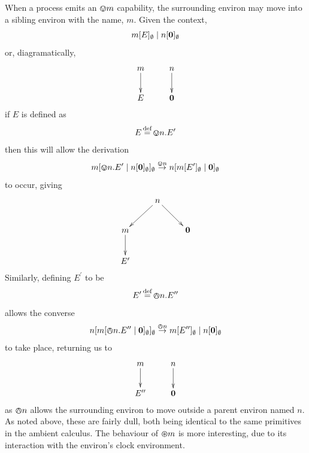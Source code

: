When a process emits an $\varovee m$ capability, the surrounding environ
may move into a sibling environ with the name, $m$.  Given the context,
\begin{equation}
{m}[ E ]_{\emptyset}\;|\;{n}[ \textbf{0} ]_{\emptyset}
\end{equation}
or, diagramatically,
\[\CompileMatrices
\xymatrix{
m \ar@{->}[d] &
n \ar@{->}[d] \\
E & \nil \\
}
\]
if $E$ is defined as
\begin{equation}
E \operatorname{\stackrel{\textrm{def}}{=}} \varovee n.E^\prime
\end{equation}
then this will allow the derivation
\begin{equation}
{m}[ \varovee n.E^\prime \;|\; {n}[ \textbf{0} ]_{\emptyset} ]_{\emptyset} \stackrel{\varovee n}{\rightarrow} 
{n}[ {m}[ E^\prime ]_{\emptyset} \;|\; \textbf{0} ]_{\emptyset}
\end{equation}
to occur, giving
\[\CompileMatrices
\xymatrix{
&
n \ar@{->}[ld] \ar@{->}[rd] & \\
m \ar@{->}[d] & & \nil \\
E' & &
}
\]
Similarly, defining $E^\prime$ to be
\begin{equation}
E^\prime \operatorname{\stackrel{\textrm{def}}{=}} \varowedge n.E^{\prime\prime}
\end{equation}
allows the converse
\begin{equation}
{n}[ {m}[ \varowedge n.E^{\prime\prime} \;|\; \textbf{0} ]_{\emptyset} ]_{\emptyset} \stackrel{\varowedge n}{\rightarrow}
{m}[ E^{\prime\prime} ]_{\emptyset} \;|\; {n}[ \textbf{0} ]_{\emptyset}
\end{equation}
to take place, returning us to
\[\CompileMatrices
\xymatrix{
m \ar@{->}[d] &
n \ar@{->}[d] \\
E^{\prime\prime} & \nil \\
}
\]
as $\varowedge n$ allows the surrounding environ to move outside a
parent environ named $n$.  As noted above, these are fairly dull, both
being identical to the same primitives in the ambient calculus.  The
behaviour of $\varoast m$ is more interesting, due to its interaction
with the environ's clock environment.

